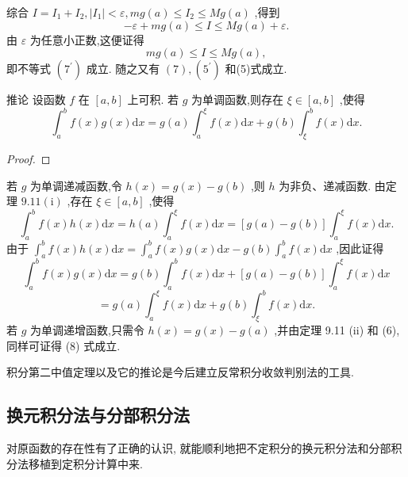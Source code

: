 综合 \(I = {I}_{1} + {I}_{2},\left| {I}_{1}\right|  < \varepsilon ,{mg}\left( a\right)  \leq  {I}_{2} \leq  {Mg}\left( a\right)\) ,得到
\[
- \varepsilon  + {mg}\left( a\right)  \leq  I \leq  {Mg}\left( a\right)  + \varepsilon .
\]
由 \(\varepsilon\) 为任意小正数,这便证得
\[
{mg}\left( a\right)  \leq  I \leq  {Mg}\left( a\right) ,
\]
即不等式 \(\left( {7}^{\prime }\right)\) 成立. 随之又有 \(\left( 7\right) ,\left( {5}^{\prime }\right)\) 和(5)式成立.

推论 设函数 \(f\) 在 \(\left\lbrack  {a,b}\right\rbrack\) 上可积. 若 \(g\) 为单调函数,则存在 \(\xi  \in  \left\lbrack  {a,b}\right\rbrack\) ,使得
\[
{\int }_{a}^{b}f\left( x\right) g\left( x\right) \mathrm{d}x = g\left( a\right) {\int }_{a}^{\xi }f\left( x\right) \mathrm{d}x + g\left( b\right) {\int }_{\xi }^{b}f\left( x\right) \mathrm{d}x. \tag{8}
\]
\begin{proof}

\end{proof}
若 \(g\) 为单调递减函数,令 \(h\left( x\right)  = g\left( x\right)  - g\left( b\right)\) ,则 \(h\) 为非负、递减函数. 由定理 \({9.11}\left( \mathrm{i}\right)\) ,存在 \(\xi  \in  \left\lbrack  {a,b}\right\rbrack\) ,使得
\[
{\int }_{a}^{b}f\left( x\right) h\left( x\right) \mathrm{d}x = h\left( a\right) {\int }_{a}^{\xi }f\left( x\right) \mathrm{d}x = \left\lbrack  {g\left( a\right)  - g\left( b\right) }\right\rbrack  {\int }_{a}^{\xi }f\left( x\right) \mathrm{d}x.
\]
由于 \({\int }_{a}^{b}f\left( x\right) h\left( x\right) \mathrm{d}x = {\int }_{a}^{b}f\left( x\right) g\left( x\right) \mathrm{d}x - g\left( b\right) {\int }_{a}^{b}f\left( x\right) \mathrm{d}x\) ,因此证得
\[
{\int }_{a}^{b}f\left( x\right) g\left( x\right) \mathrm{d}x = g\left( b\right) {\int }_{a}^{b}f\left( x\right) \mathrm{d}x + \left\lbrack  {g\left( a\right)  - g\left( b\right) }\right\rbrack  {\int }_{a}^{\xi }f\left( x\right) \mathrm{d}x
\]
\[
= g\left( a\right) {\int }_{a}^{\xi }f\left( x\right) \mathrm{d}x + g\left( b\right) {\int }_{\xi }^{b}f\left( x\right) \mathrm{d}x.
\]
若 \(g\) 为单调递增函数,只需令 \(h\left( x\right)  = g\left( x\right)  - g\left( a\right)\) ,并由定理 9.11 (ii) 和 (6),同样可证得 (8) 式成立.

积分第二中值定理以及它的推论是今后建立反常积分收敛判别法的工具.

\subsection{换元积分法与分部积分法}

对原函数的存在性有了正确的认识, 就能顺利地把不定积分的换元积分法和分部积分法移植到定积分计算中来.

